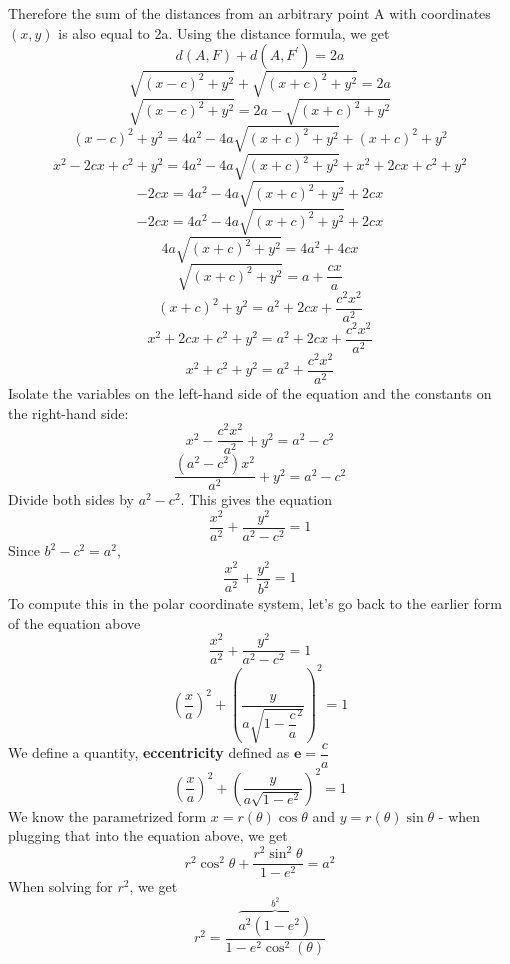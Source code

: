 \documentclass[12pt,addpoints]{exam}
\begin{document}
	Therefore the sum of the distances from an arbitrary point A with coordinates $(x,y)$ is also equal to 2a. Using the distance formula, we get
	$$d(A,F)+d(A,F^{\prime})=2a$$
	$$\sqrt{(x-c)^2+y^2}+\sqrt{(x+c)^2+y^2}=2a$$	
	$$\sqrt{(x-c)^2+y^2}=2a-\sqrt{(x+c)^2+y^2}$$
	$$(x-c)^2+y^2=4a^2-4a\sqrt{(x+c)^2+y^2}+(x+c)^2+y^2$$
	$$x^2-2cx+c^2+y^2=4a^2-4a\sqrt{(x+c)^2+y^2}+x^2+2cx+c^2+y^2$$
	$$-2cx=4a^2-4a\sqrt{(x+c)^2+y^2}+2cx$$
	$$-2cx=4a^2-4a\sqrt{(x+c)^2+y^2}+2cx$$
	$$4a\sqrt{(x+c)^2+y^2}=4a^2+4cx$$
	$$\sqrt{(x+c)^2+y^2}=a+\dfrac{cx}{a}$$
	$$(x+c)^2+y^2=a^2+2cx+\dfrac{c^2x^2}{a^2}$$
	$$x^2+2cx+c^2+y^2=a^2+2cx+\dfrac{c^2x^2}{a^2}$$
	$$x^2+c^2+y^2=a^2+\dfrac{c^2x^2}{a^2}$$
	Isolate the variables on the left-hand side of the equation and the constants on the right-hand side:
	$$x^2-\dfrac{c^2x^2}{a^2}+y^2=a^2-c^2$$
	$$\dfrac{(a^2-c^2)x^2}{a^2}+y^2=a^2-c^2$$
	Divide both sides by $a^2-c^2$. This gives the equation
	$$\dfrac{x^2}{a^2}+\dfrac{y^2}{a^2-c^2}=1$$
	Since $b^2-c^2=a^2$,
	$$\dfrac{x^2}{a^2}+\dfrac{y^2}{b^2}=1$$
	To compute this in the polar coordinate system, let's go back to the earlier form of the equation above
	$$\dfrac{x^2}{a^2}+\dfrac{y^2}{a^2-c^2}=1$$
	$$\left(\frac{x}{a}\right)^2+\left(\frac{y}{a\sqrt{1-\dfrac{c}{a}^2}}\right)^2=1$$
	We define a quantity, \textbf{eccentricity} defined as $\textbf{e}=\dfrac{c}{a}$
	$$\left(\frac{x}{a}\right)^2+\left(\frac{y}{a\sqrt{1-e^2}}\right)^2=1$$
	We know the parametrized form  $x=r(\theta)\cos\theta$ and  $y=r(\theta)\sin\theta$ - when plugging that into the equation above, we get
	$$r^2\cos^2\theta+\frac{r^2\sin^2\theta}{1-e^2}=a^2$$
	When solving for $r^2$, we get
	$$r^2=\frac{\overbrace{a^2\!\left(1-e^2\right)}^{b^2}}{1-e^2\cos^2(\theta)}$$
\end{document}
